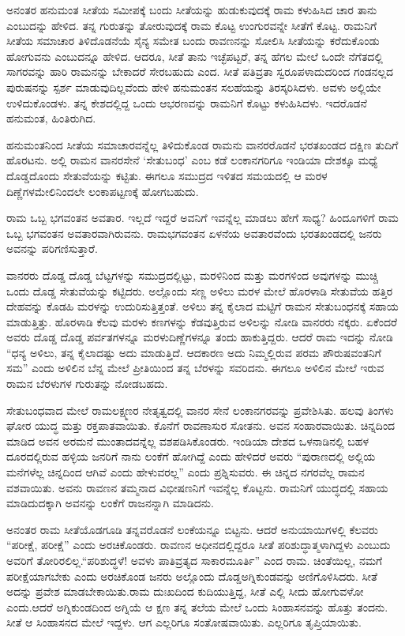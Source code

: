 ಅನಂತರ ಹನುಮಂತ ಸೀತೆಯ ಸಮೀಪಕ್ಕೆ ಬಂದು ಸೀತೆಯನ್ನು ಹುಡುಕುವುದಕ್ಕೆ ರಾಮ ಕಳುಹಿಸಿದ ಚಾರ ತಾನು ಎಂಬುದನ್ನು ಹೇಳಿದ. ತನ್ನ ಗುರುತನ್ನು ತೋರುವುದಕ್ಕೆ ರಾಮ ಕೊಟ್ಟ ಉಂಗುರವನ್ನೇ ಸೀತೆಗೆ ಕೊಟ್ಟ. ರಾಮನಿಗೆ ಸೀತೆಯ ಸಮಾಚಾರ ತಿಳಿದೊಡನೆಯೆ ಸೈನ್ಯ ಸಮೇತ ಬಂದು ರಾವಣನನ್ನು ಸೋಲಿಸಿ ಸೀತೆಯನ್ನು ಕರೆದುಕೊಂಡು ಹೋಗುವನು ಎಂಬುದನ್ನೂ ಹೇಳಿದ. ಆದರೂ, ಸೀತೆ ತಾನು ಇಚ್ಛೆಪಟ್ಟರೆ, ತನ್ನ ಹೆಗಲ ಮೇಲೆ ಒಂದೇ ನೆಗೆತದಲ್ಲಿ ಸಾಗರವನ್ನು ಹಾರಿ ರಾಮನನ್ನು ಬೇಕಾದರೆ ಸೇರಬಹುದು ಎಂದ. ಸೀತೆ ಪತಿವ್ರತಾ ಸ್ವರೂಪಳಾದುದರಿಂದ ಗಂಡನಲ್ಲದ ಪುರುಷನನ್ನು ಸ್ಪರ್ಶ ಮಾಡುವುದಿಲ್ಲವೆಂದು ಹೇಳಿ ಹನುಮಂತನ ಸಲಹೆಯನ್ನು ತಿರಸ್ಕರಿಸಿದಳು. ಅವಳು ಅಲ್ಲಿಯೇ ಉಳಿದುಕೊಂಡಳು. ತನ್ನ ಕೇಶದಲ್ಲಿದ್ದ ಒಂದು ಆಭರಣವನ್ನು ರಾಮನಿಗೆ ಕೊಟ್ಟು ಕಳುಹಿಸಿದಳು. ಇದರೊಡನೆ ಹನುಮಂತ, ಹಿಂತಿರುಗಿದ.

ಹನುಮಂತನಿಂದ ಸೀತೆಯ ಸಮಾಚಾರವನ್ನೆಲ್ಲ ತಿಳಿದುಕೊಂಡ ರಾಮನು ವಾನರರೊಡನೆ ಭರತಖಂಡದ ದಕ್ಷಿಣ ತುದಿಗೆ ಹೊರಟನು. ಅಲ್ಲಿ ರಾಮನ ವಾನರಸೇನೆ ‘ಸೇತುಬಂಧ’ ಎಂಬ ಕಡೆ ಲಂಕಾನಗರಿಗೂ ಇಂಡಿಯಾ ದೇಶಕ್ಕೂ ಮಧ್ಯೆ ದೊಡ್ಡದೊಂದು ಸೇತುವೆಯನ್ನು ಕಟ್ಟಿತು. ಈಗಲೂ ಸಮುದ್ರದ ಇಳಿತದ ಸಮಯದಲ್ಲಿ ಆ ಮರಳ ದಿಣ್ಣೆಗಳ\break ಮೇಲಿನಿಂದಲೇ ಲಂಕಾಪಟ್ಟಣಕ್ಕೆ ಹೋಗಬಹುದು.

ರಾಮ ಒಬ್ಬ ಭಗವಂತನ ಅವತಾರ. ಇಲ್ಲದೆ ಇದ್ದರೆ ಅವನಿಗೆ ಇವನ್ನೆಲ್ಲ ಮಾಡಲು ಹೇಗೆ ಸಾಧ್ಯ? ಹಿಂದೂಗಳಿಗೆ ರಾಮ ಒಬ್ಬ ಭಗವಂತನ ಅವತಾರವಾಗಿರುವನು. ರಾಮ\break ಭಗವಂತನ ಏಳನೆಯ ಅವತಾರವೆಂದು ಭರತಖಂಡದಲ್ಲಿ ಜನರು ಅವನನ್ನು ಪರಿಗಣಿಸುತ್ತಾರೆ.

ವಾನರರು ದೊಡ್ಡ ದೊಡ್ಡ ಬೆಟ್ಟಗಳನ್ನು ಸಮುದ್ರದಲ್ಲಿಟ್ಟು, ಮರಳಿನಿಂದ ಮತ್ತು ಮರಗಳಿಂದ ಅವುಗಳನ್ನು ಮುಚ್ಚಿ ಒಂದು ದೊಡ್ಡ ಸೇತುವೆಯನ್ನು ಕಟ್ಟಿದರು. ಅಲ್ಲೊಂದು ಸಣ್ಣ ಅಳಿಲು ಮರಳ ಮೇಲೆ ಹೊರಳಾಡಿ ಸೇತುವೆಯ ಹತ್ತಿರ ದೇಹವನ್ನು ಕೊಡಹಿ ಮರಳನ್ನು ಉದುರಿಸುತ್ತಿತ್ತಂತೆ. ಅಳಿಲು ತನ್ನ ಕೈಲಾದ ಮಟ್ಟಿಗೆ ರಾಮನ ಸೇತುಬಂಧನಕ್ಕೆ ಸಹಾಯ ಮಾಡುತ್ತಿತ್ತು. ಹೊರಳಾಡಿ ಕೆಲವು ಮರಳು ಕಣಗಳನ್ನು ಕೆಡವುತ್ತಿರುವ ಅಳಿಲನ್ನು ನೋಡಿ ವಾನರರು ನಕ್ಕರು. ಏಕೆಂದರೆ ಅವರು ದೊಡ್ಡ ದೊಡ್ಡ ಪರ್ವತಗಳನ್ನೂ ಮರಳುದಿಣ್ಣೆಗಳನ್ನೂ ತಂದು ಹಾಕುತ್ತಿದ್ದರು. ಆದರೆ ರಾಮ ಇದನ್ನು ನೋಡಿ “ಧನ್ಯ ಅಳಿಲು, ತನ್ನ ಕೈಲಾದಷ್ಟು ಅದು ಮಾಡುತ್ತಿದೆ. ಆದಕಾರಣ ಅದು ನಿಮ್ಮಲ್ಲಿರುವ ಪರಮ ಪೌರುಷವಂತನಿಗೆ ಸಮ” ಎಂದು ಅಳಿಲಿನ ಬೆನ್ನ ಮೇಲೆ ಪ್ರೀತಿಯಿಂದ ತನ್ನ ಬೆರಳನ್ನು ಸವರಿದನು. ಈಗಲೂ ಅಳಿಲಿನ ಮೇಲೆ ಇರುವ ರಾಮನ ಬೆರಳುಗಳ ಗುರುತನ್ನು ನೋಡಬಹದು.

ಸೇತುಬಂಧವಾದ ಮೇಲೆ ರಾಮಲಕ್ಷ್ಮಣರ ನೇತೃತ್ವದಲ್ಲಿ ವಾನರ ಸೇನೆ ಲಂಕಾ\break ನಗರವನ್ನು ಪ್ರವೇಶಿಸಿತು. ಹಲವು ತಿಂಗಳು ಘೋರ ಯುದ್ಧ ಮತ್ತು ರಕ್ತಪಾತವಾಯಿತು. ಕೊನೆಗೆ ರಾವಣಾಸುರ ಸೋತನು. ಅವನ ಸಂಹಾರವಾಯಿತು. ಚಿನ್ನದಿಂದ ಮಾಡಿದ ಅವನ ಅರಮನೆ ಮುಂತಾದವನ್ನೆಲ್ಲ ವಶಪಡಿಸಿಕೊಂಡರು. ಇಂಡಿಯಾ ದೇಶದ ಒಳನಾಡಿನಲ್ಲಿ ಬಹಳ ದೂರದಲ್ಲಿರುವ ಹಳ್ಳಿಯ ಜನರಿಗೆ ನಾನು ಲಂಕೆಗೆ ಹೋಗಿದ್ದೆ ಎಂದು ಹೇಳಿದರೆ ಅವರು “ಪುರಾಣದಲ್ಲಿ ಅಲ್ಲಿಯ ಮನೆಗಳೆಲ್ಲ ಚಿನ್ನದಿಂದ ಆಗಿವೆ ಎಂದು ಹೇಳುವರಲ್ಲ” ಎಂದು ಪ್ರಶ್ನಿಸುವರು. ಈ ಚಿನ್ನದ ನಗರವೆಲ್ಲ ರಾಮನ ವಶವಾಯಿತು. ಅವನು ರಾವಣನ ತಮ್ಮನಾದ ವಿಭೀಷಣನಿಗೆ ಇವನ್ನೆಲ್ಲ ಕೊಟ್ಟನು. ರಾಮನಿಗೆ ಯುದ್ಧದಲ್ಲಿ ಸಹಾಯ ಮಾಡಿದುದಕ್ಕಾಗಿ ಅವನನ್ನು ಲಂಕೆಗೆ ರಾಜನನ್ನಾಗಿ ಮಾಡಿದನು.

ಅನಂತರ ರಾಮ ಸೀತೆಯೊಡಗೂಡಿ ತನ್ನವರೊಡನೆ ಲಂಕೆಯನ್ನೂ ಬಿಟ್ಟನು. ಆದರೆ ಅನುಯಾಯಿಗಳಲ್ಲಿ ಕೆಲವರು “ಪರೀಕ್ಷೆ, ಪರೀಕ್ಷೆ” ಎಂದು ಅರಚಿಕೊಂಡರು. ರಾವಣನ ಅಧೀನದಲ್ಲಿದ್ದರೂ ಸೀತೆ ಪರಿಶುದ್ಧಾತ್ಮಳಾಗಿದ್ದಳು ಎಂಬುದು ಅವರಿಗೆ ತೋರಿರಲಿಲ್ಲ.\break “ಪರಿಶುದ್ಧಳೆ! ಅವಳು ಪಾತಿವ್ರತ್ಯದ ಸಾಕಾರಮೂರ್ತಿ” ಎಂದ ರಾಮ. ಚಿಂತೆಯಿಲ್ಲ, ನಮಗೆ ಪರೀಕ್ಷೆಯಾಗಬೇಕು ಎಂದು ಅರಚಿಕೊಂಡ ಜನರು ಅಲ್ಲೊಂದು ದೊಡ್ಡ\break ಅಗ್ನಿಕುಂಡವನ್ನು ಅಣಿಗೊಳಿಸಿದರು. ಸೀತೆ ಅದನ್ನು ಪ್ರವೇಶ ಮಾಡಬೇಕಾಯಿತು.\break ರಾಮ ದುಃಖದಿಂದ ಕುದಿಯುತ್ತಿದ್ದ, ಸೀತೆ ಎಲ್ಲಿ ಸೀದು ಹೋಗುವಳೋ ಎಂದು.\break ಆದರೆ ಅಗ್ನಿಕುಂಡದಿಂದ ಅಗ್ನಿಯೆ ಆ ಕ್ಷಣ ತನ್ನ ತಲೆಯ ಮೇಲೆ ಒಂದು ಸಿಂಹಾಸನವನ್ನು ಹೊತ್ತು ತಂದನು. ಸೀತೆ ಆ ಸಿಂಹಾಸನದ ಮೇಲೆ ಇದ್ದಳು. ಆಗ ಎಲ್ಲರಿಗೂ ಸಂತೋಷವಾಯಿತು. ಎಲ್ಲರಿಗೂ ತೃಪ್ತಿಯಾಯಿತು.

